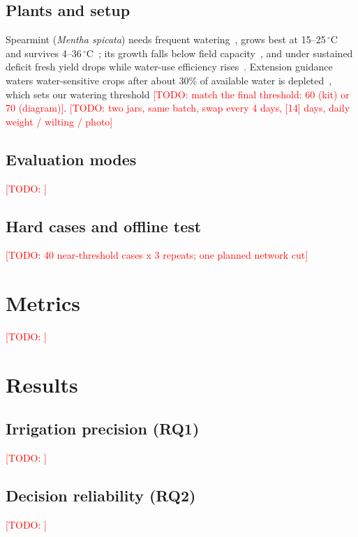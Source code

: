 \documentclass[10pt,twocolumn]{article}
\newcommand{\todo}[1]{\textcolor{red}{[TODO: #1]}}
\begin{document}
\subsection{Plants and setup}
Spearmint (\emph{Mentha spicata}) needs frequent watering~\cite{NSW}, grows best at 15--25\,$^\circ$C~\cite{OMAFRA} and survives 4--36\,$^\circ$C~\cite{ISWS}; its growth falls below field capacity~\cite{FUM}, and under sustained deficit fresh yield drops while water-use efficiency rises~\cite{OKW11}. Extension guidance waters water-sensitive crops after about 30\% of available water is depleted~\cite{VT}, which sets our watering threshold \todo{match the final threshold: 60 (kit) or 70 (diagram)}.
\todo{two jars, same batch, swap every 4 days, [14] days, daily weight / wilting / photo}
\subsection{Evaluation modes}
\todo{}
\subsection{Hard cases and offline test}
\todo{40 near-threshold cases x 3 repeats; one planned network cut}

\section{Metrics}\label{sec:metrics}
\todo{}

\section{Results}\label{sec:results}
\subsection{Irrigation precision (RQ1)}
\todo{}
\subsection{Decision reliability (RQ2)}
\todo{}
\end{document}
